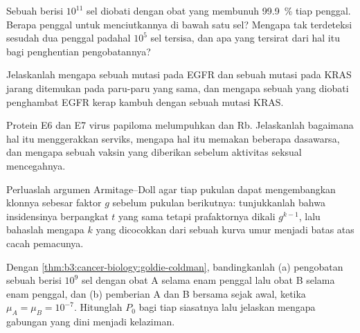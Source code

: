 \begin{exercise}[$\star\star$]\label{exo:b3:cancer-biology:7}
Sebuah  berisi $10^{11}$ sel diobati dengan obat yang membunuh
\qty{99.9}{\%} tiap penggal. Berapa penggal untuk menciutkannya di bawah satu
sel? Mengapa  tak terdeteksi sesudah dua penggal padahal
$10^{5}$ sel tersisa, dan apa yang tersirat dari hal itu bagi penghentian
pengobatannya?
\end{exercise}

\begin{exercise}[$\star\star$]\label{exo:b3:cancer-biology:8}
Jelaskanlah mengapa sebuah mutasi pada EGFR dan sebuah mutasi pada KRAS jarang
ditemukan pada  paru-paru yang sama, dan mengapa sebuah  yang diobati
penghambat EGFR kerap kambuh dengan sebuah mutasi KRAS.
\end{exercise}

\begin{exercise}[$\star\star$]\label{exo:b3:cancer-biology:9}
Protein E6 dan E7 virus papiloma melumpuhkan  dan Rb. Jelaskanlah
bagaimana hal itu menggerakkan  serviks, mengapa hal itu memakan
beberapa dasawarsa, dan mengapa sebuah vaksin yang diberikan sebelum aktivitas
seksual mencegahnya.
\end{exercise}

\begin{exercise}[$\star\star\star$]\label{exo:b3:cancer-biology:10}
Perluaslah argumen Armitage--Doll agar tiap pukulan dapat mengembangkan
klonnya sebesar faktor $g$ sebelum pukulan berikutnya: tunjukkanlah bahwa
insidensinya berpangkat $t$ yang sama tetapi prafaktornya dikali $g^{k-1}$,
lalu bahaslah mengapa $k$ yang dicocokkan dari sebuah kurva umur menjadi batas
atas cacah pemacunya.
\end{exercise}

\begin{exercise}[$\star\star\star$]\label{exo:b3:cancer-biology:11}
Dengan \cref{thm:b3:cancer-biology:goldie-coldman}, bandingkanlah (a)
pengobatan sebuah  berisi $10^{9}$ sel dengan obat A selama enam penggal
lalu obat B selama enam penggal, dan (b) pemberian A dan B bersama sejak awal,
ketika $\mu_{A} =
\mu_{B} = 10^{-7}$. Hitunglah $P_{0}$ bagi tiap siasatnya lalu jelaskan
mengapa gabungan yang dini menjadi kelaziman.
\end{exercise}

